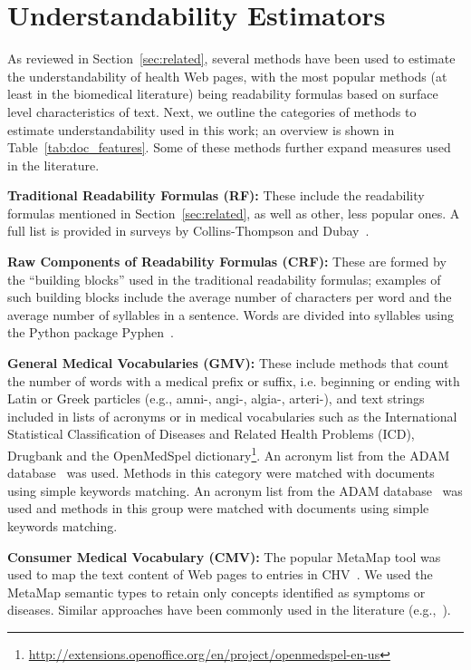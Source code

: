 
\section*{Understandability Estimators}
\label{sec:proxies}

As reviewed in Section~\ref{sec:related}, several methods have been used to estimate the understandability of health Web pages, with the most popular methods (at least in the biomedical literature) being readability formulas based on surface level characteristics of text. Next, we outline the categories of methods to estimate understandability used in this work; an overview is shown in Table~\ref{tab:doc_features}. Some of these methods further expand measures used in the literature. 
 
\textbf{Traditional Readability Formulas (RF):}
These include the readability formulas mentioned in Section~\ref{sec:related}, as well as other, less popular ones. A full list is provided in surveys by Collins-Thompson \cite{collins2014computational} and Dubay~\cite{dubay04}.

\textbf{Raw Components of Readability Formulas (CRF):}
These are formed by the ``building blocks'' used in the traditional readability formulas; examples of such building blocks include the average number of characters per word and the average number of syllables in a sentence. Words are divided into syllables using the Python package Pyphen~\cite{pyphen}.

\textbf{General Medical Vocabularies (GMV):}
These include methods that count the number of words with a medical prefix or suffix, i.e. beginning or ending with Latin or Greek particles (e.g., amni-, angi-, algia-, arteri-), and text strings included in lists of acronyms or in medical vocabularies such as the International Statistical Classification of Diseases and Related Health Problems (ICD), Drugbank and the OpenMedSpel dictionary\footnote{\url{http://extensions.openoffice.org/en/project/openmedspel-en-us}}. An acronym list from the ADAM database~\cite{zhou2006} was used. Methods in this category were matched with documents using simple keywords matching. An acronym list from the ADAM database~\cite{zhou2006} was used and methods in this group were matched with documents using simple keywords matching.

\textbf{Consumer Medical Vocabulary (CMV):}
The popular MetaMap \cite{aronson10} tool was used to map the text content of Web pages to entries in  CHV~\cite{zeng06}.
We used the MetaMap semantic types to retain only concepts identified as symptoms or diseases. Similar approaches have been commonly used in the literature (e.g.,~\cite{pang16,agrafiotesA16,palotti16,yates13}).

